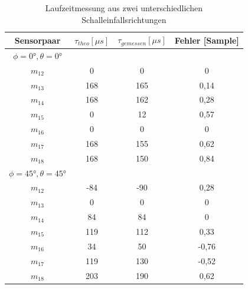 \begin{table}[]
     \center
     \begin{tabular}{cccc}
          \hline
          Sensorpaar & $\tau_{theo} [\mu s ]$ & $\tau_{gemessen} [\mu s ]$ & Fehler [Sample] \\
          \hline \hline
          $\phi = 0°, \theta = 0°$ \\
          \hline
          $m_{12}$    &    0                  &  0                        & 0        \\
          $m_{13}$    &    168                & 165                       & 0,14        \\
          $m_{14}$    &    168                & 162                       & 0,28        \\
          $m_{15}$    &    0                  & 12                        & 0,57       \\
          $m_{16}$    &    0                  & 0                         & 0        \\
          $m_{17}$    &    168                & 155                       & 0,62    \\
          $m_{18}$    &    168                & 150                       & 0,84    \\
          \hline
          \hline
          $\phi = 45°, \theta = 45°$ \\
          \hline
          $m_{12}$    &   -84                 &  -90                      & 0,28        \\
          $m_{13}$    &    0                  & 0                         & 0        \\
          $m_{14}$    &    84                 & 84                        & 0        \\
          $m_{15}$    &    119                & 112                       & 0,33       \\
          $m_{16}$    &    34                 & 50                        & -0,76        \\
          $m_{17}$    &    119                & 130                       & -0,52    \\
          $m_{18}$    &    203                & 190                       & 0,62    \\
          \hline 
     \end{tabular}
  \caption{Laufzeitmessung aus zwei unterschiedlichen Schalleinfallsrichtungen}
 \label{tab:Prototyp_NewArray_Laufzeitmessung}
 \end{table}
 

